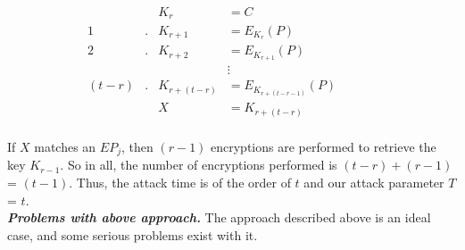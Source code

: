\begin{align*}
& & K_r &= C & & & &\\
1&. &K_{r+1} &= E_{K_r}(P)  & & & &\\
2&. &K_{r+2} &= E_{K_{r+1}}(P) & & & &\\
& & &\vdots & & & &\\
(t-r) &. &K_{r + (t-r)} &= E_{K_{r + (t-r-1)}}(P) & & & &\\
& & X &= K_{r + (t - r)} & & & &\\
\end{align*}

If $X$ matches an $EP_j$, then $(r-1)$ encryptions are performed to retrieve the key $K_{r-1}$. So in all, the number of encryptions performed is $(t-r) + (r-1)$ = $(t-1)$. Thus, the attack time is of the order of $t$ and our attack parameter $T$ = $t$.\\

\noindent \textit{\textbf{Problems with above approach.}} The approach described above is an ideal case, and some serious problems exist with it.

